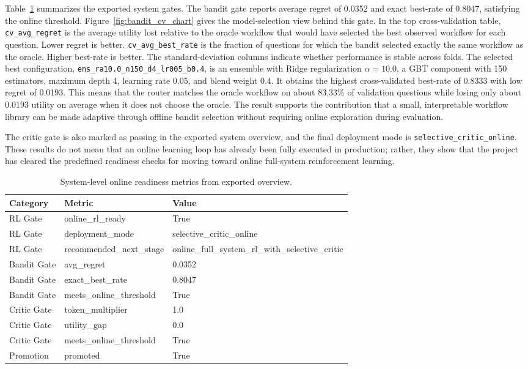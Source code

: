 \documentclass[12pt,a4paper]{article}
\begin{document}
Table~\ref{tab:bandit_system_gates} summarizes the exported system gates. The bandit gate reports average regret of 0.0352 and exact best-rate of 0.8047, satisfying the online threshold. Figure~\ref{fig:bandit_cv_chart} gives the model-selection view behind this gate. In the top cross-validation table, \texttt{cv\_avg\_regret} is the average utility lost relative to the oracle workflow that would have selected the best observed workflow for each question. Lower regret is better. \texttt{cv\_avg\_best\_rate} is the fraction of questions for which the bandit selected exactly the same workflow as the oracle. Higher best-rate is better. The standard-deviation columns indicate whether performance is stable across folds. The selected best configuration, \texttt{ens\_ra10.0\_n150\_d4\_lr005\_b0.4}, is an ensemble with Ridge regularization $\alpha=10.0$, a GBT component with 150 estimators, maximum depth 4, learning rate 0.05, and blend weight 0.4. It obtains the highest cross-validated best-rate of 0.8333 with low regret of 0.0193. This means that the router matches the oracle workflow on about 83.33\% of validation questions while losing only about 0.0193 utility on average when it does not choose the oracle. The result supports the contribution that a small, interpretable workflow library can be made adaptive through offline bandit selection without requiring online exploration during evaluation.

The critic gate is also marked as passing in the exported system overview, and the final deployment mode is \texttt{selective\_critic\_online}. These results do not mean that an online learning loop has already been fully executed in production; rather, they show that the project has cleared the predefined readiness checks for moving toward online full-system reinforcement learning.

\begin{table}[H]
\centering
\caption{System-level online readiness metrics from exported overview.}
\label{tab:bandit_system_gates}
\begin{tabular}{l l l}
\toprule
\textbf{Category} & \textbf{Metric} & \textbf{Value} \\
\midrule
RL Gate & online\_rl\_ready & True \\
RL Gate & deployment\_mode & selective\_critic\_online \\
RL Gate & recommended\_next\_stage & online\_full\_system\_rl\_with\_selective\_critic \\
Bandit Gate & avg\_regret & 0.0352 \\
Bandit Gate & exact\_best\_rate & 0.8047 \\
Bandit Gate & meets\_online\_threshold & True \\
Critic Gate & token\_multiplier & 1.0 \\
Critic Gate & utility\_gap & 0.0 \\
Critic Gate & meets\_online\_threshold & True \\
Promotion & promoted & True \\
\bottomrule
\end{tabular}
\end{table}
\end{document}
